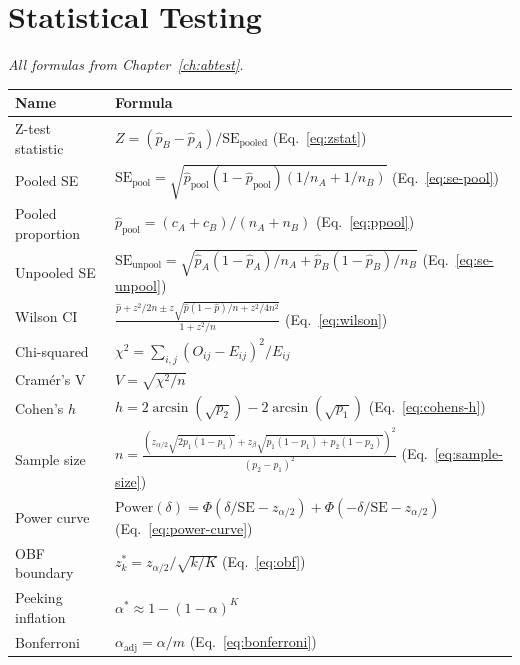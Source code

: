 \section{Statistical Testing}

\noindent\textit{All formulas from Chapter~\ref{ch:abtest}.}

\medskip

\begin{tabularx}{\textwidth}{lX}
\toprule
\textbf{Name} & \textbf{Formula} \\
\midrule
Z-test statistic &
$Z = (\hat{p}_B - \hat{p}_A) / \text{SE}_{\text{pooled}}$
\quad (Eq.~\ref{eq:zstat}) \\[8pt]

Pooled SE &
$\text{SE}_{\text{pool}} = \sqrt{\hat{p}_{\text{pool}}(1-\hat{p}_{\text{pool}})(1/n_A + 1/n_B)}$
\quad (Eq.~\ref{eq:se-pool}) \\[8pt]

Pooled proportion &
$\hat{p}_{\text{pool}} = (c_A + c_B)/(n_A + n_B)$
\quad (Eq.~\ref{eq:ppool}) \\[8pt]

Unpooled SE &
$\text{SE}_{\text{unpool}} = \sqrt{\hat{p}_A(1-\hat{p}_A)/n_A + \hat{p}_B(1-\hat{p}_B)/n_B}$
\quad (Eq.~\ref{eq:se-unpool}) \\[8pt]

Wilson CI &
$\displaystyle \frac{\hat{p} + z^2/2n \pm z\sqrt{\hat{p}(1-\hat{p})/n + z^2/4n^2}}{1 + z^2/n}$
\quad (Eq.~\ref{eq:wilson}) \\[12pt]

Chi-squared &
$\chi^2 = \sum_{i,j} (O_{ij} - E_{ij})^2 / E_{ij}$ \\[8pt]

Cram\'er's V &
$V = \sqrt{\chi^2 / n}$ \\[8pt]

Cohen's $h$ &
$h = 2\arcsin(\sqrt{p_2}) - 2\arcsin(\sqrt{p_1})$
\quad (Eq.~\ref{eq:cohens-h}) \\[8pt]

Sample size &
$\displaystyle n = \frac{(z_{\alpha/2}\sqrt{2p_1(1-p_1)} + z_\beta\sqrt{p_1(1-p_1)+p_2(1-p_2)})^2}{(p_2-p_1)^2}$
\quad (Eq.~\ref{eq:sample-size}) \\[12pt]

Power curve &
$\text{Power}(\delta) = \Phi(\delta/\text{SE} - z_{\alpha/2}) + \Phi(-\delta/\text{SE} - z_{\alpha/2})$
\quad (Eq.~\ref{eq:power-curve}) \\[8pt]

OBF boundary &
$z_k^* = z_{\alpha/2} / \sqrt{k/K}$
\quad (Eq.~\ref{eq:obf}) \\[8pt]

Peeking inflation &
$\alpha^* \approx 1 - (1-\alpha)^K$ \\[8pt]

Bonferroni &
$\alpha_{\text{adj}} = \alpha / m$
\quad (Eq.~\ref{eq:bonferroni}) \\
\bottomrule
\end{tabularx}

